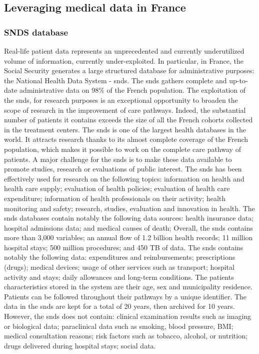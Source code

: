 \subsection{Leveraging medical data in France}

\subsubsection{SNDS database}


Real-life patient data represents an unprecedented and currently underutilized
volume of information, currently under-exploited. In particular, in France, the
Social Security generates a large structured database for administrative
purposes: the National Health Data System - \acf{snds}. The \ac{snds} gathers
complete and up-to-date administrative data on 98\% of the French population.
The exploitation of the \ac{snds}, for research purposes is an exceptional
opportunity to broaden the scope of research in the improvement of care
pathways. Indeed, the substantial number of patients it contains exceeds the
size of all the French cohorts collected in the treatment centers. The \ac{snds}
is one of the largest health databases in the world. It attracts research thanks
to its almost complete coverage of the French population, which makes it
possible to work on the complete care pathway of patients. A major challenge for
the \ac{snds} is to make these data available to promote studies, research or
evaluations of public interest. The \ac{snds} has been effectively used for
research on the following topics: information on health and health care supply;
evaluation of health policies; evaluation of health care expenditure;
information of health professionals on their activity; health monitoring and
safety; research, studies, evaluation and innovation in health. The \ac{snds}
databases contain notably the following data sources: health insurance data;
hospital admissions data; and medical causes of death; Overall, the \ac{snds}
contains more than 3,000 variables; an annual flow of 1.2 billion health
records; 11 million hospital stays; 500 million procedures; and 450 TB of data.
The \ac{snds} contains notably the following data: expenditures and
reimbursements; prescriptions (drugs); medical devices; usage of other services
such as transport; hospital activity and stays; daily allowances and long-term
conditions. The patients characteristics stored in the system are their age, sex
and municipality residence. Patients can be followed throughout their pathways
by a unique identifier. The data in the \ac{snds} are kept for a total of 20
years, then archived for 10 years. However, the \ac{snds} does not contain:
clinical examination results such as imaging or biological data; paraclinical
data such as smoking, blood pressure, BMI; medical consultation reasons; risk
factors such as tobacco, alcohol, or nutrition; drugs delivered during hospital
stays; social data.

